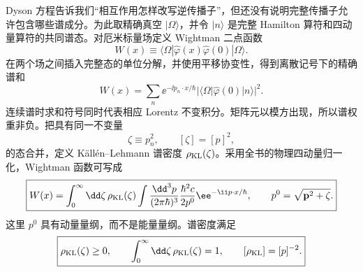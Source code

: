 Dyson 方程告诉我们“相互作用怎样改写逆传播子”，但还没有说明完整传播子允许包含哪些谱成分。为此取精确真空 $|\Omega\rangle$，并令 $|n\rangle$ 是完整 Hamilton 算符和四动量算符的共同谱态。对厄米标量场定义 Wightman 二点函数
\begin{equation*}
 W(x)\equiv\langle\Omega|\hat\varphi(x)\hat\varphi(0)|\Omega\rangle.
\end{equation*}
在两个场之间插入完整态的单位分解，并使用平移协变性，得到离散记号下的精确谱和
\begin{equation}
 \boxed{
 W(x)
 =\sum_n \ee^{-\ii p_n\cdot x/\hbar}
 |\langle\Omega|\hat\varphi(0)|n\rangle|^2.}
 \label{eq:W-spectral-sum-SI-r12}
\end{equation}
连续谱时求和符号同时代表相应 Lorentz 不变积分。矩阵元以模方出现，所以谱权重非负。把具有同一不变量
\begin{equation*}
 \zeta\equiv p_n^2,\qquad [\zeta]=[p]^2,
\end{equation*}
的态合并，定义 Källén--Lehmann 谱密度 $\rho_{\rm KL}(\zeta)$。采用全书的物理四动量归一化，Wightman 函数可写成
\begin{equation}
 \boxed{
 W(x)=\int_0^\infty\dd\zeta\,\rho_{\rm KL}(\zeta)
 \int\frac{\dd^3 p}{(2\pi\hbar)^3}\frac{\hbar^2 c}{2p^0}
 \ee^{-\ii p\cdot x/\hbar},
 \qquad p^0=\sqrt{\mathbf p^2+\zeta}.}
 \label{eq:KL-Wightman-mass-shell-r15}
\end{equation}
这里 $p^0$ 具有动量量纲，而不是能量量纲。谱密度满足
\begin{equation}
 \boxed{
 \rho_{\rm KL}(\zeta)\ge0,
 \qquad
 \int_0^\infty\dd\zeta\,\rho_{\rm KL}(\zeta)=1,
 \qquad [\rho_{\rm KL}]=[p]^{-2}.}
 \label{eq:KL-positive-normalization-r16}
\end{equation}

